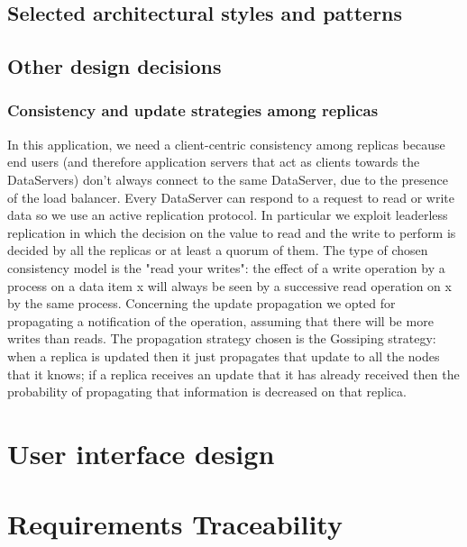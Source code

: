 \documentclass[a4paper]{report}
\begin{document}
\section{Selected architectural	styles and patterns}
\section{Other design decisions}
\subsection{Consistency and update strategies among replicas}
In this application,  we need a client-centric consistency among replicas because end users (and therefore application servers that act as clients towards the DataServers) don't always connect to the same DataServer, due to the presence of the load balancer. Every DataServer can respond to a request to read or write data so we use an active replication protocol. In particular we exploit leaderless replication in which the decision on the value to read and the write to perform is decided by all the replicas or at least a quorum of them. The type of chosen consistency model  is the "read your writes": the effect of a write operation by a process on a data item x will always be seen by a successive read operation on x by the same process. 
Concerning the update propagation we opted for propagating a notification of the operation, assuming that there will be more writes than reads.  The propagation strategy chosen is the Gossiping strategy: when a replica is updated then it just propagates that update to all the nodes that it knows; if a replica receives an update that it has already received then the probability of propagating that information is decreased on that replica. 

\chapter{User interface design}

\chapter{Requirements Traceability}
\end{document}
